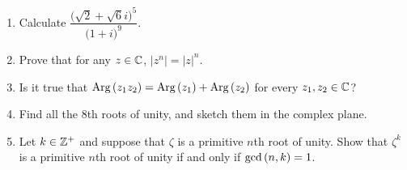 \documentclass[11pt,fleqn,dvipsnames,usenames]{article}
\begin{document}
\begin{enumerate}
\begin{multicols}{3}
\end{multicols}
\item Calculate $\dfrac{\big(\sqrt{2} + \sqrt{6}i\big)^5}{\big(1+i\big)^9}$.
\item Prove that for any $z\in\mathbb{C}$, $|z^{n}| = |z|^{n}$.
\item Is it true that $\text{Arg}\left(z_1z_2\right) = \text{Arg}\left(z_1\right) + \text{Arg}\left(z_2\right)$ for every $z_{1},z_{2}\in\mathbb{C}$?
\item Find all the $8$th roots of unity, and sketch them in the complex plane.
\item Let $k\in\mathbb{Z}^{+}$ and suppose that $\zeta$ is a primitive $n$th root of unity.  Show that $\zeta^{k}$ is a primitive $n$th root of unity if and only if $\text{gcd}\left(n,k\right) = 1$.
\end{enumerate}
\end{document}
